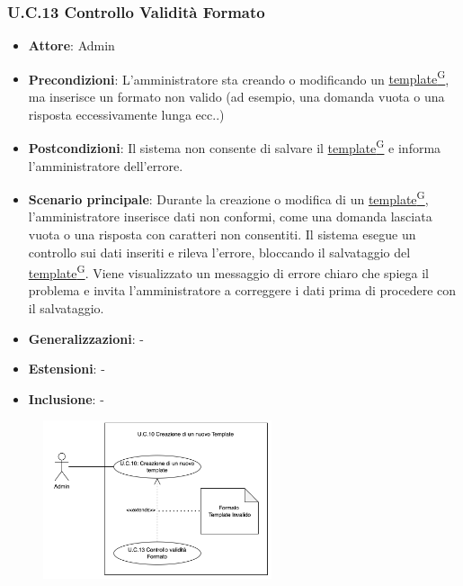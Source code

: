 \subsubsection{U.C.13 Controllo Validità Formato}
\begin{itemize}
    \item \textbf{Attore}: Admin
    \item \textbf{Precondizioni}: L'amministratore sta creando o modificando un \href{https://code7crusaders.github.io/docs/PB/documentazione_interna/glossario.html#template}{template\textsuperscript{G}}, ma inserisce un formato non valido (ad esempio, una domanda vuota o una risposta eccessivamente lunga ecc..)
    \item \textbf{Postcondizioni}: Il sistema non consente di salvare il \href{https://code7crusaders.github.io/docs/PB/documentazione_interna/glossario.html#template}{template\textsuperscript{G}} e informa l'amministratore dell'errore.
    \item \textbf{Scenario principale}: Durante la creazione o modifica di un \href{https://code7crusaders.github.io/docs/PB/documentazione_interna/glossario.html#template}{template\textsuperscript{G}}, l'amministratore inserisce dati non conformi, come una domanda lasciata vuota o una risposta con caratteri non consentiti. Il sistema esegue un controllo sui dati inseriti e rileva l'errore, bloccando il salvataggio del \href{https://code7crusaders.github.io/docs/PB/documentazione_interna/glossario.html#template}{template\textsuperscript{G}}. Viene visualizzato un messaggio di errore chiaro che spiega il problema e invita l'amministratore a correggere i dati prima di procedere con il salvataggio.
    \item \textbf{Generalizzazioni}: -
    \item \textbf{Estensioni}: -
    \item \textbf{Inclusione}: -
\end{itemize}
\begin{figure}[H]
    \centering
    \includegraphics[width=0.6\textwidth]{img/UC13.1.png}
\end{figure}
